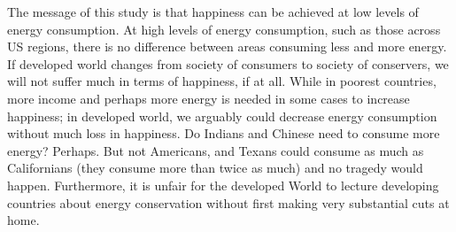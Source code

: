 \documentclass[10pt, letterpaper]{article}
\begin{document}
\begin{spacing}{1.4}
%
 


The message of this study is that happiness can be achieved at low levels of
energy consumption. At high levels of energy consumption, such as
those across US regions, there is no difference between areas consuming less and more
energy. If developed world changes from society of consumers
to society of conservers, we will not suffer much in terms of
happiness, if at all.  While in poorest countries, more  income and perhaps more energy
 is needed in some cases to increase happiness; in developed world, we arguably could  decrease
energy consumption without much loss in happiness. %
Do Indians and Chinese need to consume more energy? Perhaps. But not Americans, and
Texans could consume as much as Californians (they consume more than twice as
much) and no tragedy would
happen. %
Furthermore, it is unfair for the developed World to lecture developing
countries about energy conservation without first making very substantial cuts
at home.


\end{spacing}
\end{document}
